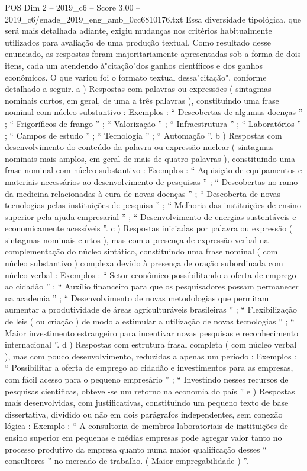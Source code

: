 \begin{textsample}{POS Dim 2 – 2019\_c6 – Score 3.00 – 2019\_c6/enade\_2019\_eng\_amb\_0cc6810176.txt}
Essa diversidade tipológica, que será mais detalhada adiante, exigiu mudanças nos critérios habitualmente utilizados para avaliação de uma produção textual.
Como resultado desse enunciado, as respostas foram majoritariamente apresentadas sob a forma de dois itens, cada um atendendo à"citação"dos ganhos científicos e dos ganhos econômicos.
O que variou foi o formato textual dessa"citação", conforme detalhado a seguir. a ) Respostas com palavras ou expressões ( sintagmas nominais curtos, em geral, de uma a três palavras ), constituindo uma frase nominal com núcleo substantivo : Exemplos : “ Descobertas de algumas doenças ” ; “ Frigoríficos de frango ” ; “ Valorização ” ; “ Infraestrutura ” ; “ Laboratórios ” ; “ Campos de estudo ” ; “ Tecnologia ” ; “ Automação ”. b ) Respostas com desenvolvimento do conteúdo da palavra ou expressão nuclear ( sintagmas nominais mais amplos, em geral de mais de quatro palavras ), constituindo uma frase nominal com núcleo substantivo : Exemplos : “ Aquisição de equipamentos e materiais necessários ao desenvolvimento de pesquisas ” ; “ Descobertas no ramo da medicina relacionadas à cura de novas doenças ” ; “ Descoberta de novas tecnologias pelas instituições de pesquisa ” ; “ Melhoria das instituições de ensino superior pela ajuda empresarial ” ; “ Desenvolvimento de energias sustentáveis e economicamente acessíveis ”. c ) Respostas iniciadas por palavra ou expressão ( sintagmas nominais curtos ), mas com a presença de expressão verbal na complementação do núcleo sintático, constituindo uma frase nominal ( com núcleo substantivo ) complexa devido à presença de oração subordinada com núcleo verbal : Exemplos : “ Setor econômico possibilitando a oferta de emprego ao cidadão ” ; “ Auxílio financeiro para que os pesquisadores possam permanecer na academia ” ; “ Desenvolvimento de novas metodologias que permitam aumentar a produtividade de áreas agriculturáveis brasileiras ” ; “ Flexibilização de leis ( ou criação ) de modo a estimular a utilização de novas tecnologias ” ; “ Maior investimento estrangeiro para incentivar novas pesquisas e reconhecimento internacional ”. d ) Respostas com estrutura frasal completa ( com núcleo verbal ), mas com pouco desenvolvimento, reduzidas a apenas um período : Exemplos : “ Possibilitar a oferta de emprego ao cidadão e investimentos para as empresas, com fácil acesso para o pequeno empresário ” ; “ Investindo nesses recursos de pesquisas cientificas, obteve -se um retorno na economia do país ” e ) Respostas mais desenvolvidas, com justificativas, constituindo um pequeno texto de base dissertativa, dividido ou não em dois parágrafos independentes, sem conexão lógica : Exemplo : “ A consultoria de membros laboratoriais de instituições de ensino superior em pequenas e médias empresas pode agregar valor tanto no processo produtivo da empresa quanto numa maior qualificação desses “ consultores ” no mercado de trabalho. ( Maior empregabilidade ) ”.

\end{textsample}
